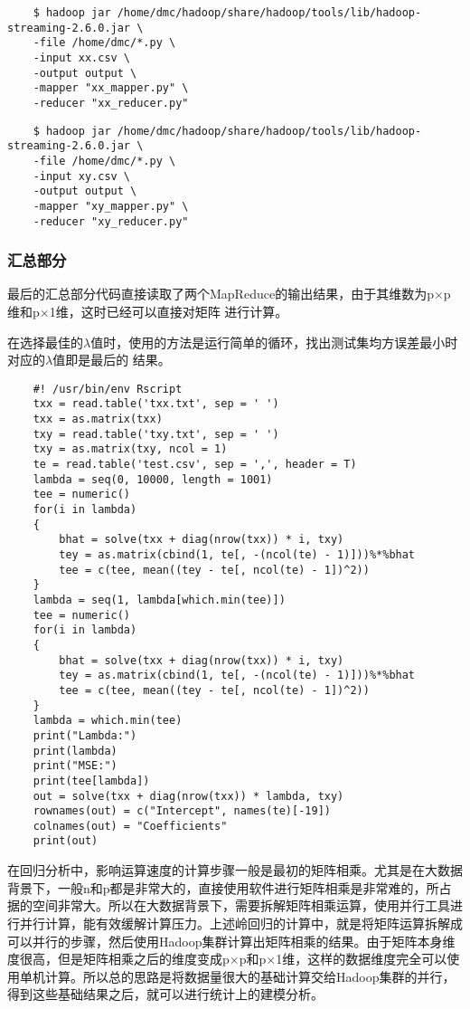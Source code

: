 \begin{lstlisting}
	$ hadoop jar /home/dmc/hadoop/share/hadoop/tools/lib/hadoop-streaming-2.6.0.jar \
	-file /home/dmc/*.py \
	-input xx.csv \
	-output output \
	-mapper "xx_mapper.py" \
	-reducer "xx_reducer.py"
\end{lstlisting}
\begin{lstlisting}
	$ hadoop jar /home/dmc/hadoop/share/hadoop/tools/lib/hadoop-streaming-2.6.0.jar \
	-file /home/dmc/*.py \
	-input xy.csv \
	-output output \
	-mapper "xy_mapper.py" \
	-reducer "xy_reducer.py"
\end{lstlisting}
\subsubsection{汇总部分}\label{ux6c47ux603bux90e8ux5206}

最后的汇总部分代码直接读取了两个MapReduce的输出结果，由于其维数为p$\times$p维和p$\times$1维，这时已经可以直接对矩阵
进行计算。

在选择最佳的$\lambda$值时，使用的方法是运行简单的循环，找出测试集均方误差最小时对应的$\lambda$值即是最后的
结果。

\begin{lstlisting}
	#! /usr/bin/env Rscript
	txx = read.table('txx.txt', sep = ' ')
	txx = as.matrix(txx)
	txy = read.table('txy.txt', sep = ' ')
	txy = as.matrix(txy, ncol = 1)
	te = read.table('test.csv', sep = ',', header = T)
	lambda = seq(0, 10000, length = 1001)
	tee = numeric()
	for(i in lambda)
	{
	    bhat = solve(txx + diag(nrow(txx)) * i, txy)
	    tey = as.matrix(cbind(1, te[, -(ncol(te) - 1)]))%*%bhat
	    tee = c(tee, mean((tey - te[, ncol(te) - 1])^2))
	}
	lambda = seq(1, lambda[which.min(tee)])
	tee = numeric()
	for(i in lambda)
	{
	    bhat = solve(txx + diag(nrow(txx)) * i, txy)
	    tey = as.matrix(cbind(1, te[, -(ncol(te) - 1)]))%*%bhat
	    tee = c(tee, mean((tey - te[, ncol(te) - 1])^2))
	}
	lambda = which.min(tee)
	print("Lambda:")
	print(lambda)
	print("MSE:")
	print(tee[lambda])
	out = solve(txx + diag(nrow(txx)) * lambda, txy)
	rownames(out) = c("Intercept", names(te)[-19])
	colnames(out) = "Coefficients"
	print(out)
\end{lstlisting}

{\color{red}在回归分析中，影响运算速度的计算步骤一般是最初的矩阵相乘。尤其是在大数据背景下，一般n和p都是非常大的，直接使用软件进行矩阵相乘是非常难的，所占据的空间非常大。所以在大数据背景下，需要拆解矩阵相乘运算，使用并行工具进行并行计算，能有效缓解计算压力。上述岭回归的计算中，就是将矩阵运算拆解成可以并行的步骤，然后使用Hadoop集群计算出矩阵相乘的结果。由于矩阵本身维度很高，但是矩阵相乘之后的维度变成p$\times$p和p$\times$1维，这样的数据维度完全可以使用单机计算。所以总的思路是将数据量很大的基础计算交给Hadoop集群的并行，得到这些基础结果之后，就可以进行统计上的建模分析。}
